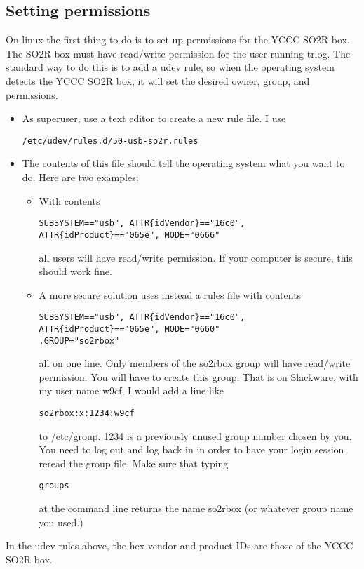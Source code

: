 \documentclass[12pt]{article}
\begin{document}
\subsection{Setting permissions}
On linux the first thing to do is to set up permissions for the YCCC SO2R box.
The SO2R box must have read/write permission for the user running trlog.
The standard way to do this is to add a udev rule, so when the operating
system detects the YCCC SO2R box, it will set the desired owner, group,
and permissions.
\begin{itemize}
\item
As superuser, use a text editor to create a new rule file. I use
\begin{verbatim}
/etc/udev/rules.d/50-usb-so2r.rules
\end{verbatim}
\item
The contents of this file should tell the operating system what you want
to do. Here are two examples:
\begin{itemize}
\item
With contents
\begin{verbatim}
SUBSYSTEM=="usb", ATTR{idVendor}=="16c0", ATTR{idProduct}=="065e", MODE="0666"
\end{verbatim}
all users will have read/write permission. If your computer is secure,
this should work fine.
\item

A more secure solution uses instead a rules file
with contents
\begin{verbatim}
SUBSYSTEM=="usb", ATTR{idVendor}=="16c0", ATTR{idProduct}=="065e", MODE="0660"
,GROUP="so2rbox"
\end{verbatim}
all on one line.
Only members of the so2rbox group will have read/write permission.
You will have to create this group. That is on Slackware, with my
user name w9cf, I would add a line like
\begin{verbatim}
so2rbox:x:1234:w9cf
\end{verbatim}
to /etc/group. 1234 is a previously unused group number chosen by you.
You need to log out and log back in in order to have your login session
reread the group file. Make sure that typing
\begin{verbatim}
groups
\end{verbatim}
at the command line returns the name so2rbox (or whatever group name you
used.)
\end{itemize}
\end{itemize}
In the udev rules above,
the hex vendor and product IDs are those of the YCCC SO2R box.
\end{document}
